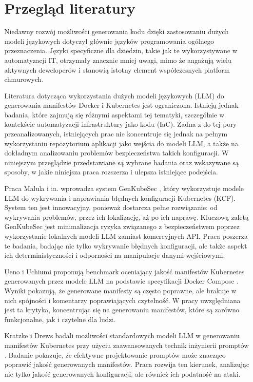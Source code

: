 \clearpage %
\section{Przegląd literatury}

Niedawny rozwój możliwości generowania kodu dzięki zastosowaniu dużych modeli językowych dotyczył głównie języków programowania ogólnego przeznaczenia. Języki specyficzne dla dziedzin, takie jak te wykorzystywane w automatyzacji IT, otrzymały znacznie mniej uwagi, mimo że angażują wielu aktywnych deweloperów i stanowią istotny element współczesnych platform chmurowych. \cite{pujar_invited_2023}

Literatura dotycząca wykorzystania dużych modeli językowych (LLM) do generowania manifestów Docker i Kubernetes jest ograniczona. Istnieją jednak badania, które zajmują się różnymi aspektami tej tematyki, szczególnie w kontekście automatyzacji infrastruktury jako kodu (IaC). Żadna z do tej pory przeanalizowanych, istniejących prac nie koncentruje się jednak na pełnym wykorzystaniu repozytorium aplikacji jako wejścia do modeli LLM, a także na dokładnym analizowaniu problemów bezpieczeństwa takich konfiguracji. W niniejszym przeglądzie przedstawiane są wybrane badania oraz wskazywane są sposoby, w jakie niniejsza praca rozszerza i ulepsza istniejące podejścia.

Praca Malula i in. wprowadza system GenKubeSec \cite{malul_genkubesec_2024}, który wykorzystuje modele LLM do wykrywania i naprawiania błędnych konfiguracji Kubernetes (KCF). System ten jest innowacyjny, ponieważ dostarcza pełne rozwiązanie: od wykrywania problemów, przez ich lokalizację, aż po ich naprawę. Kluczową zaletą GenKubeSec jest minimalizacja ryzyka związanego z bezpieczeństwem poprzez wykorzystanie lokalnych modeli LLM zamiast komercyjnych API. Praca poszerza te badania, badając nie tylko wykrywanie błędnych konfiguracji, ale także aspekt ich deterministyczności i odporności na manipulacje danymi wejściowymi.

Ueno i Uchiumi proponują benchmark oceniający jakość manifestów Kubernetes generowanych przez modele LLM na podstawie specyfikacji Docker Compose \cite{ueno_migrating_2024}. Wyniki pokazują, że generowane manifesty są często poprawne, ale brakuje w nich spójności i komentarzy poprawiających czytelność. W pracy uwzględniana jest ta krytyka, koncentrując się na generowaniu manifestów, które są zarówno funkcjonalne, jak i czytelne dla ludzi.

Kratzke i Drews badali możliwości standardowych modeli LLM w generowaniu manifestów Kubernetes przy użyciu zaawansowanych technik inżynierii promptów \cite{kratzke_dont_2024}. Badanie pokazuje, że efektywne projektowanie promptów może znacząco poprawić jakość generowanych manifestów. Praca rozwija ten kierunek, analizując nie tylko jakość generowanych konfiguracji, ale również ich podatność na ataki.

